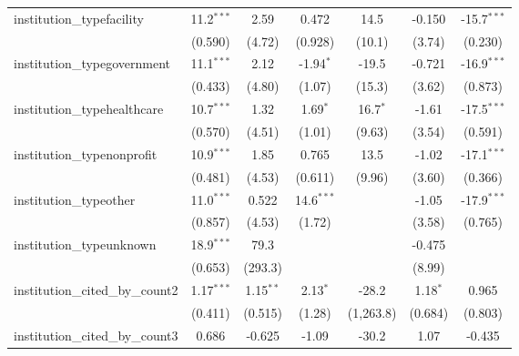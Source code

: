 \begin{tabular}{lcccccc}
   institution\_typefacility             & 11.2$^{***}$  & 2.59         & 0.472         & 14.5          & -0.150        & -15.7$^{***}$\\   
                                         & (0.590)       & (4.72)       & (0.928)       & (10.1)        & (3.74)        & (0.230)\\   
   institution\_typegovernment           & 11.1$^{***}$  & 2.12         & -1.94$^{*}$   & -19.5         & -0.721        & -16.9$^{***}$\\   
                                         & (0.433)       & (4.80)       & (1.07)        & (15.3)        & (3.62)        & (0.873)\\   
   institution\_typehealthcare           & 10.7$^{***}$  & 1.32         & 1.69$^{*}$    & 16.7$^{*}$    & -1.61         & -17.5$^{***}$\\   
                                         & (0.570)       & (4.51)       & (1.01)        & (9.63)        & (3.54)        & (0.591)\\   
   institution\_typenonprofit            & 10.9$^{***}$  & 1.85         & 0.765         & 13.5          & -1.02         & -17.1$^{***}$\\   
                                         & (0.481)       & (4.53)       & (0.611)       & (9.96)        & (3.60)        & (0.366)\\   
   institution\_typeother                & 11.0$^{***}$  & 0.522        & 14.6$^{***}$  &               & -1.05         & -17.9$^{***}$\\   
                                         & (0.857)       & (4.53)       & (1.72)        &               & (3.58)        & (0.765)\\   
   institution\_typeunknown              & 18.9$^{***}$  & 79.3         &               &               & -0.475        &   \\   
                                         & (0.653)       & (293.3)      &               &               & (8.99)        &   \\   
   institution\_cited\_by\_count2        & 1.17$^{***}$  & 1.15$^{**}$  & 2.13$^{*}$    & -28.2         & 1.18$^{*}$    & 0.965\\   
                                         & (0.411)       & (0.515)      & (1.28)        & (1,263.8)     & (0.684)       & (0.803)\\   
   institution\_cited\_by\_count3        & 0.686         & -0.625       & -1.09         & -30.2         & 1.07          & -0.435\\   

\end{tabular}
